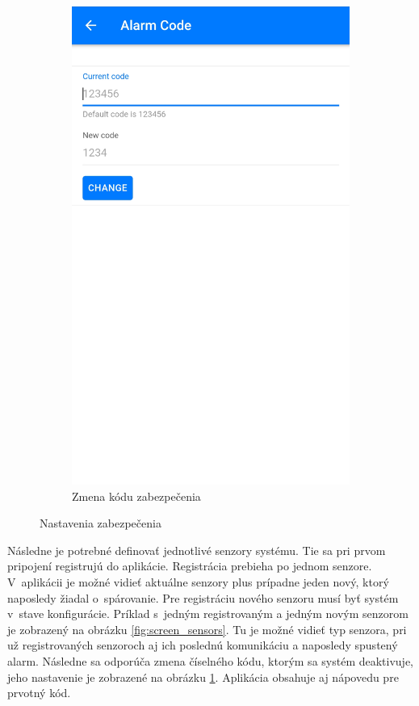 \begin{figure}[!ht]
\begin{subfigure}{.4\textwidth}
      \includegraphics[width=.8\linewidth]{obrazky-figures/screen_code.jpg}  
      \caption{Zmena kódu zabezpečenia}
      \label{fig:screen_code}
    \end{subfigure}
    \caption{Nastavenia zabezpečenia}
    \label{fig:nastavenie_zabezpecenia}
\end{figure}

Následne je potrebné definovať jednotlivé senzory systému. Tie sa pri prvom pripojení registrujú do aplikácie. Registrácia prebieha po jednom senzore. V~aplikácii je možné vidieť aktuálne senzory plus prípadne jeden nový, ktorý naposledy žiadal o~spárovanie. Pre registráciu nového senzoru musí byť systém v~stave konfigurácie. Príklad s~jedným registrovaným a jedným novým senzorom je zobrazený na obrázku \ref{fig:screen_sensors}. Tu je možné vidieť typ senzora, pri už registrovaných senzoroch aj ich poslednú komunikáciu a naposledy spustený alarm. Následne sa odporúča zmena číselného kódu, ktorým sa systém deaktivuje, jeho nastavenie je zobrazené na obrázku \ref{fig:screen_code}. Aplikácia obsahuje aj nápovedu pre prvotný kód.

